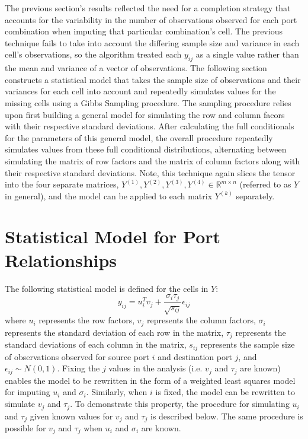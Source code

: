 \documentclass[12pt,twoside]{dukestatscithesis}
\theoremstyle{definition}
\theoremstyle{definition}
\theoremstyle{definition}
\theoremstyle{remark}
\begin{document}
The previous section's results reflected the need for a completion
strategy that accounts for the variability in the number of observations
observed for each port combination when imputing that particular
combination's cell. The previous technique fails to take into account
the differing sample size and variance in each cell's observations, so
the algorithm treated each \(y_{ij}\) as a single value rather than the
mean and variance of a vector of observations. The following section
constructs a statistical model that takes the sample size of
observations and their variances for each cell into account and
repeatedly simulates values for the missing cells using a Gibbs Sampling
procedure. The sampling procedure relies upon first building a general
model for simulating the row and column facors with their respective
standard deviations. After calculating the full conditionals for the
parameters of this general model, the overall procedure repeatedly
simulates values from these full conditional distributions, alternating
between simulating the matrix of row factors and the matrix of column
factors along with their respective standard deviations. Note, this
technique again slices the tensor into the four separate matrices,
\(Y^{(1)}, Y^{(2)}, Y^{(3)}, Y^{(4)} \in \mathbb{R}^{m \times n}\)
(referred to as \(Y\) in general), and the model can be applied to each
matrix \(Y^{(k)}\) separately.

\section{Statistical Model for Port
Relationships}\label{statistical-model-for-port-relationships}

The following statistical model is defined for the cells in \(Y\):
\[y_{ij} = u_i^Tv_j + \frac{\sigma_i \tau_j}{\sqrt{s_{ij}}}\epsilon_{ij}\]
where \(u_i\) represents the row factors, \(v_j\) represents the column
factors, \(\sigma_i\) represents the standard deviation of each row in
the matrix, \(\tau_j\) represents the standard deviations of each column
in the matrix, \(s_{ij}\) represents the sample size of observations
observed for source port \(i\) and destination port \(j\), and
\(\epsilon_{ij} \sim N(0,1)\). Fixing the \(j\) values in the analysis
(i.e. \(v_j\) and \(\tau_j\) are known) enables the model to be
rewritten in the form of a weighted least squares model for imputing
\(u_i\) and \(\sigma_i\). Similarly, when \(i\) is fixed, the model can
be rewritten to simulate \(v_j\) and \(\tau_j\). To demonstrate this
property, the procedure for simulating \(u_i\) and \(\tau_j\) given
known values for \(v_j\) and \(\tau_j\) is described below. The same
procedure is possible for \(v_j\) and \(\tau_j\) when \(u_i\) and
\(\sigma_i\) are known.
\end{document}
